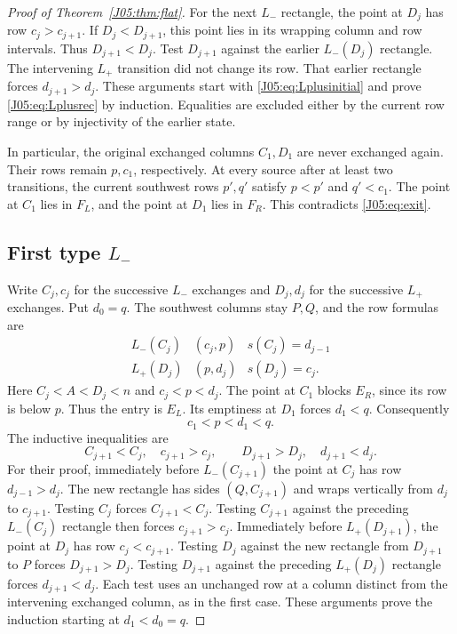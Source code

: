 \documentclass[11pt,oneside]{report}
\theoremstyle{definition}
\numberwithin{equation}{section}
\newcommand{\Lp}{L_+}\newcommand{\Lm}{L_-}
\begin{document}
\begin{proof}[Proof of Theorem~\ref{J05:thm:flat}]
For the next $\Lm$ rectangle, the point at $D_j$ has row $c_j>c_{j+1}$.
If $D_j<D_{j+1}$, this point lies in its wrapping column and row intervals.
Thus $D_{j+1}<D_j$. Test $D_{j+1}$ against the earlier $\Lm(D_j)$ rectangle.
The intervening $\Lp$ transition did not change its row. That earlier rectangle
forces $d_{j+1}>d_j$. These arguments start with \eqref{J05:eq:Lplusinitial}
and prove \eqref{J05:eq:Lplusrec} by induction. Equalities are excluded either
by the current row range or by injectivity of the earlier state.

In particular, the original exchanged columns $C_1,D_1$ are never exchanged
again. Their rows remain $p,c_1$, respectively. At every source after at least
two transitions, the current southwest rows $p',q'$ satisfy
$p<p'$ and $q'<c_1$. The point at $C_1$ lies in $F_L$, and the point at
$D_1$ lies in $F_R$. This contradicts \eqref{J05:eq:exit}.

\subsection*{First type $\Lm$}

Write $C_j,c_j$ for the successive $\Lm$ exchanges and $D_j,d_j$ for the
successive $\Lp$ exchanges. Put $d_0=q$. The southwest columns stay $P,Q$,
and the row formulas are
\[
 \begin{array}{c|c|c}
 \Lm(C_j)&(c_j,p)&s(C_j)=d_{j-1}\\
 \Lp(D_j)&(p,d_j)&s(D_j)=c_j.
 \end{array}
\]
Here $C_j<A<D_j<n$ and $c_j<p<d_j$.
The point at $C_1$ blocks $E_R$, since its row is below $p$. Thus the entry is
$E_L$. Its emptiness at $D_1$ forces $d_1<q$. Consequently
\[
 c_1<p<d_1<q.
\]
The inductive inequalities are
\[
 C_{j+1}<C_j,\quad c_{j+1}>c_j,\qquad
 D_{j+1}>D_j,\quad d_{j+1}<d_j.
\]
For their proof, immediately before $\Lm(C_{j+1})$ the point at $C_j$ has
row $d_{j-1}>d_j$. The new rectangle has sides $(Q,C_{j+1})$ and wraps
vertically from $d_j$ to $c_{j+1}$. Testing $C_j$ forces
$C_{j+1}<C_j$. Testing $C_{j+1}$ against the preceding $\Lm(C_j)$ rectangle
then forces $c_{j+1}>c_j$.
Immediately before $\Lp(D_{j+1})$, the point at $D_j$ has row
$c_j<c_{j+1}$. Testing $D_j$ against the new rectangle from $D_{j+1}$ to
$P$ forces $D_{j+1}>D_j$. Testing $D_{j+1}$ against the preceding
$\Lp(D_j)$ rectangle forces $d_{j+1}<d_j$. Each test uses an unchanged row
at a column distinct from the intervening exchanged column, as in the first
case. These arguments prove the induction starting at $d_1<d_0=q$.


\end{proof}
\end{document}
